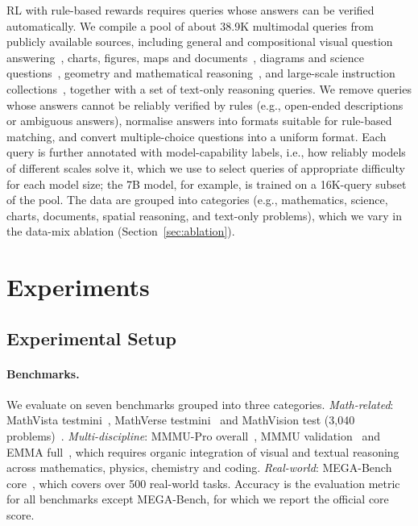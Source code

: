 \documentclass{article}
\begin{document}
RL with rule-based rewards requires queries whose answers can be verified automatically. We compile a pool of about 38.9K multimodal queries from publicly available sources, including general and compositional visual question answering~\citep{vqa,goyal2017making,hudson2019gqa,johnson2017clevr,vizwiz}, charts, figures, maps and documents~\citep{masry2022chartqa,figureqa,chang2022mapqa,docvqa}, diagrams and science questions~\citep{ai2d,saikh2022scienceqa,lu2021iconqa}, geometry and mathematical reasoning~\citep{GeoQA,gllava,lu2021inter,shi2024mathllavabootstrappingmathematicalreasoning,amini2019mathqainterpretablemathword}, and large-scale instruction collections~\citep{mammothvl,visualwebinstruct,infinity-mm}, together with a set of text-only reasoning queries. We remove queries whose answers cannot be reliably verified by rules (e.g., open-ended descriptions or ambiguous answers), normalise answers into formats suitable for rule-based matching, and convert multiple-choice questions into a uniform format. Each query is further annotated with model-capability labels, i.e., how reliably models of different scales solve it, which we use to select queries of appropriate difficulty for each model size; the 7B model, for example, is trained on a 16K-query subset of the pool. The data are grouped into categories (e.g., mathematics, science, charts, documents, spatial reasoning, and text-only problems), which we vary in the data-mix ablation (Section~\ref{sec:ablation}).

\section{Experiments}
\label{sec:experiments}

\subsection{Experimental Setup}
\label{sec:setup}

\paragraph{Benchmarks.} We evaluate on seven benchmarks grouped into three categories. \emph{Math-related}: MathVista testmini~\citep{mathvista}, MathVerse testmini~\citep{mathverse} and MathVision test (3,040 problems)~\citep{mathvision}. \emph{Multi-discipline}: MMMU-Pro overall~\citep{mmmupro}, MMMU validation~\citep{yue2024mmmu} and EMMA full~\citep{emma}, which requires organic integration of visual and textual reasoning across mathematics, physics, chemistry and coding. \emph{Real-world}: MEGA-Bench core~\citep{chen2024mega}, which covers over 500 real-world tasks. Accuracy is the evaluation metric for all benchmarks except MEGA-Bench, for which we report the official core score.
\end{document}
